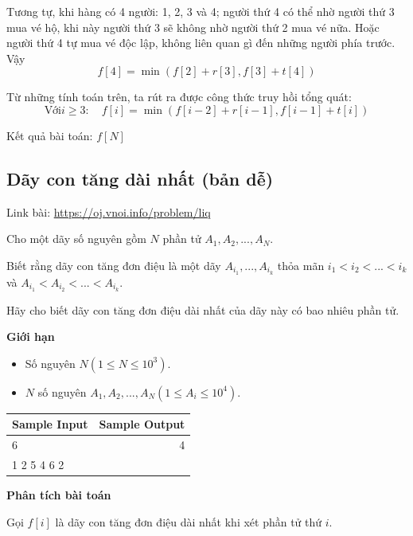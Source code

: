 \documentclass{article}
\begin{document}
Tương tự, khi hàng có 4 người: 1, 2, 3 và 4; người thứ 4 có thể nhờ người thứ 3 mua vé hộ, khi này người thứ 3 sẽ không nhờ người thứ 2 mua vé nữa. Hoặc người thứ 4 tự mua vé độc lập, không liên quan gì đến những người phía trước. Vậy
\[
    f[4] = \min \left( f[2] + r[3], f[3] + t[4] \right)
\]

Từ những tính toán trên, ta rút ra được công thức truy hồi tổng quát:
\[
    \text{Với} i \geq 3: \quad f[i] = \min \left( f[i - 2] + r[i - 1], f[i - 1] + t[i]  \right)
\]

Kết quả bài toán: $f[N]$
\subsection{Dãy con tăng dài nhất (bản dễ)}
Link bài: \url{https://oj.vnoi.info/problem/liq}

\begin{tcolorbox}[
    colback=blue!5,        %
    colframe=blue!75!black,%
    title={Đề bài}
]
Cho một dãy số nguyên gồm $N$ phần tử $A_1, A_2,...,A_N$.

Biết rằng dãy con tăng đơn điệu là một dãy $A_{i_1},...,A_{i_k}$ thỏa mãn $i_1 < i_2 <...<i_k$ và $A_{i_1} < A_{i_2} <...<A_{i_k}$. 

Hãy cho biết dãy con tăng đơn điệu dài nhất của dãy này có bao nhiêu phần tử.
\end{tcolorbox}

\textbf{Giới hạn}
\begin{itemize}
    \item Số nguyên $N (1 \leq N \leq 10^3)$.
    \item $N$ số nguyên $A_1, A_2,...,A_N (1 \leq A_i \leq 10^4)$.
\end{itemize}

\begin{table}[h]
    \centering
    \begin{tabular}{|l|r|}
        \hline
        \textbf{Sample Input} & \textbf{Sample Output} \\
        \hline
		6& 4\\ 
		1 2 5 4 6 2&  \\ 
		\hline
    \end{tabular}
\end{table}

\vspace{5em}

\textbf{Phân tích bài toán}

Gọi \( f[i] \) là dãy con tăng đơn điệu dài nhất khi xét phần tử thứ $i$.
\end{document}
